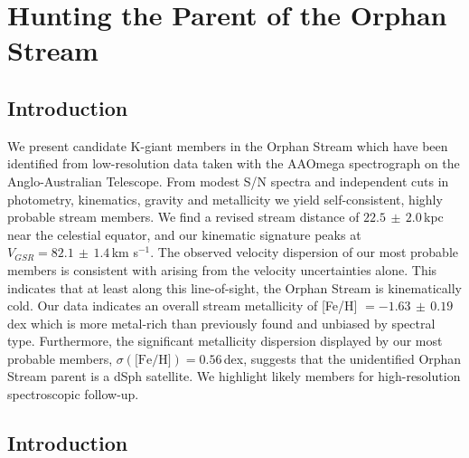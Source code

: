 \chapter{Hunting the Parent of the Orphan Stream}



\section{Introduction}
We present candidate K-giant members in the Orphan Stream which have been identified from low-resolution data taken with the AAOmega spectrograph on the Anglo-Australian Telescope. From modest S/N spectra and independent cuts in photometry, kinematics, gravity and metallicity we yield self-consistent, highly probable stream members. We find a revised stream distance of $22.5\,\pm\,2.0$\,kpc near the celestial equator, and our kinematic signature peaks at $V_{GSR} = 82.1\,\pm\,1.4$\,km s$^{-1}$. The observed velocity dispersion of our most probable members is consistent with arising from the velocity uncertainties alone. This indicates that at least along this line-of-sight, the Orphan Stream is kinematically cold. Our data indicates an overall stream metallicity of [Fe/H] $= -1.63\,\pm\,0.19$\,dex which is more metal-rich than previously found and unbiased by spectral type. Furthermore, the significant metallicity dispersion displayed by our most probable members, $\sigma(\mbox{[Fe/H]}) = 0.56$\,dex, suggests that the unidentified Orphan Stream parent is a dSph satellite. We highlight likely members for high-resolution spectroscopic follow-up.


\section{Introduction}
\label{sec:ch2-introduction}

